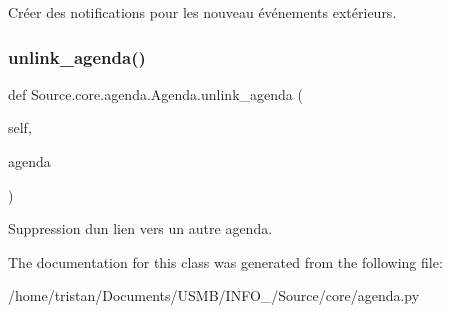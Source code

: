 Créer des notifications pour les nouveau événements extérieurs. 

\mbox{\label{classSource_1_1core_1_1agenda_1_1Agenda_a5fc4d8bb32863edde30afa3474da14c2}} 
\subsubsection{\texorpdfstring{unlink\+\_\+agenda()}{unlink\_agenda()}}
{\footnotesize\ttfamily def Source.\+core.\+agenda.\+Agenda.\+unlink\+\_\+agenda (\begin{DoxyParamCaption}\item[{}]{self,  }\item[{}]{agenda }\end{DoxyParamCaption})}



Suppression d\textquotesingle{}un lien vers un autre agenda. 



The documentation for this class was generated from the following file\+:\begin{DoxyCompactItemize}
\item 
/home/tristan/\+Documents/\+U\+S\+M\+B/\+I\+N\+F\+O\+\_/\+Source/core/agenda.\+py\end{DoxyCompactItemize}
